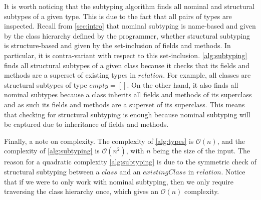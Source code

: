 \documentclass[runningheads]{llncs}
\begin{document}
It is worth noticing that the subtyping algorithm finds all nominal and structural subtypes of a given type. This is due to the fact that all pairs of types are inspected.
Recall from \autoref{sec:intro} that nominal subtyping is name-based and given by the class hierarchy defined by the programmer, whether structural subtyping is structure-based and given by the set-inclusion of fields and methods. In particular, it is contra-variant with respect to this set-inclusion.
\autoref{alg:subtyping} finds all structural subtypes of a given class because it checks that its fields and methods are a superset of existing types in $relation$. For example, all classes are structural subtypes of type $empty = []$.
On the other hand, it also finds all nominal subtypes because a class inherits all fields and methods of its superclass and as such its fields and methods are a superset of its superclass.
This means that checking for structural subtyping is enough because nominal subtyping will be captured due to inheritance of fields and methods.

Finally, a note on complexity.
The complexity of \autoref{alg:types} is $\mathcal{O}(n)$, and the complexity of \autoref{alg:subtyping} is $\mathcal{O}(n^{2})$, with $n$ being the size of the input.
The reason for a quadratic complexity \autoref{alg:subtyping} is due to the symmetric check of structural subtyping between a $class$ and an $existingClass$ in $relation$.
Notice that if we were to only work with nominal subtyping, then we only require traversing the class hierarchy once,  which gives an $\mathcal{O}(n)$ complexity.

\end{document}
